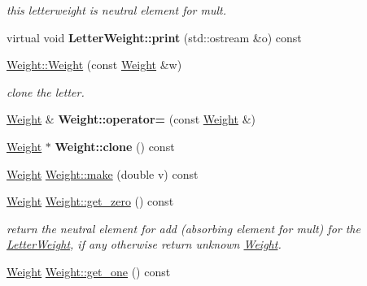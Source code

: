 \begin{DoxyCompactItemize}
\begin{DoxyCompactList}\small\item\em this letterweight is neutral element for mult. \end{DoxyCompactList}\item 
\mbox{\label{group__weight_gabef24fcc2eb0c72c420e83e6db625545}} 
virtual void {\bfseries Letter\+Weight\+::print} (std\+::ostream \&o) const
\item 
\mbox{\label{group__weight_ga9283a1d2c4b91605a0c60a2c7033cb2c}} 
\mbox{\hyperlink{group__weight_ga9283a1d2c4b91605a0c60a2c7033cb2c}{Weight\+::\+Weight}} (const \mbox{\hyperlink{classWeight}{Weight}} \&w)
\begin{DoxyCompactList}\small\item\em clone the letter. \end{DoxyCompactList}\item 
\mbox{\label{group__weight_ga548aadee137a6c274aeb1e56607b05dd}} 
\mbox{\hyperlink{classWeight}{Weight}} \& {\bfseries Weight\+::operator=} (const \mbox{\hyperlink{classWeight}{Weight}} \&)
\item 
\mbox{\label{group__weight_gade2f7d7b4ddf749326fb0a6c674387ed}} 
\mbox{\hyperlink{classWeight}{Weight}} $\ast$ {\bfseries Weight\+::clone} () const
\item 
\mbox{\hyperlink{classWeight}{Weight}} \mbox{\hyperlink{group__weight_gaf8f62c5cee5ffa37e30ef7239a33b729}{Weight\+::make}} (double v) const
\item 
\mbox{\label{group__weight_gaf7214d45d290b39f6bb2555fc46adf55}} 
\mbox{\hyperlink{classWeight}{Weight}} \mbox{\hyperlink{group__weight_gaf7214d45d290b39f6bb2555fc46adf55}{Weight\+::get\+\_\+zero}} () const
\begin{DoxyCompactList}\small\item\em return the neutral element for add (absorbing element for mult) for the \mbox{\hyperlink{classLetterWeight}{Letter\+Weight}}, if any otherwise return unknown \mbox{\hyperlink{classWeight}{Weight}}. \end{DoxyCompactList}\item 
\mbox{\label{group__weight_ga48012227b61aa4c10064bed70936d78e}} 
\mbox{\hyperlink{classWeight}{Weight}} \mbox{\hyperlink{group__weight_ga48012227b61aa4c10064bed70936d78e}{Weight\+::get\+\_\+one}} () const

\end{DoxyCompactItemize}

